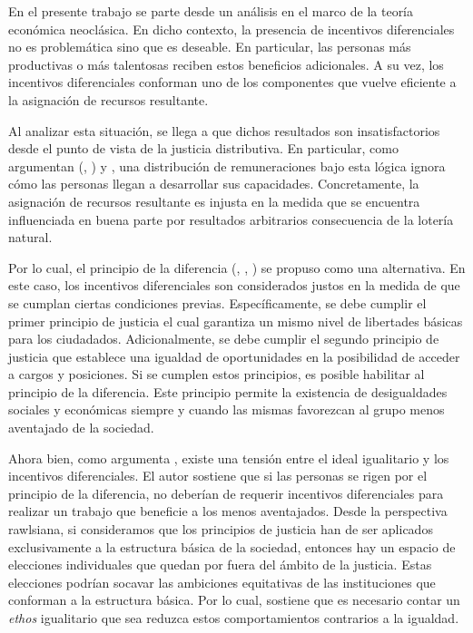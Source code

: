 




En el presente trabajo se parte desde un análisis en el marco de la teoría económica neoclásica. En dicho contexto, la presencia de incentivos diferenciales no es problemática sino que es deseable. En particular, las personas más productivas o más talentosas reciben estos beneficios adicionales. A su vez, los incentivos diferenciales conforman uno de los componentes que vuelve eficiente a la asignación de recursos resultante.

Al analizar esta situación, se llega a que dichos resultados son insatisfactorios desde el punto de vista de la justicia distributiva. En particular, como argumentan \citeauthor{Rawls_1971} (\citeyear{Rawls_1971}, \citeyear{Rawls_2002}) y \citet{Roemer_1998}, una distribución de remuneraciones bajo esta lógica ignora cómo las personas llegan a desarrollar sus capacidades. Concretamente, la asignación de recursos resultante es injusta en la medida que se encuentra influenciada en buena parte por resultados arbitrarios consecuencia de la lotería natural.

Por lo cual, el principio de la diferencia (\citeauthor{Rawls_1971}, \citeyear{Rawls_1971}, \citeyear{Rawls_2002}) se propuso como una alternativa. En este caso, los incentivos diferenciales son considerados justos en la medida de que se cumplan ciertas condiciones previas. Específicamente, se debe cumplir el primer principio de justicia el cual garantiza un mismo nivel de libertades básicas para los ciudadados. Adicionalmente, se debe cumplir el segundo principio de justicia que establece una igualdad de oportunidades en la posibilidad de acceder a cargos y posiciones. Si se cumplen estos principios, es posible habilitar al principio de la diferencia. Este principio permite la existencia de desigualdades sociales y económicas siempre y cuando las mismas favorezcan al grupo menos aventajado de la sociedad.

Ahora bien, como argumenta \citet{Cohen_2001}, existe una tensión entre el ideal igualitario y los incentivos diferenciales. El autor sostiene que si las personas se rigen por el principio de la diferencia, no deberían de requerir incentivos diferenciales para realizar un trabajo que beneficie a los menos aventajados. Desde la perspectiva rawlsiana, si consideramos que los principios de justicia han de ser aplicados exclusivamente a la estructura básica de la sociedad, entonces hay un espacio de elecciones individuales que quedan por fuera del ámbito de la justicia. Estas elecciones podrían socavar las ambiciones equitativas de las instituciones que conforman a la estructura básica. Por lo cual, \citet{Cohen_2001} sostiene que es necesario contar un \textit{ethos} igualitario que sea reduzca estos comportamientos contrarios a la igualdad.

